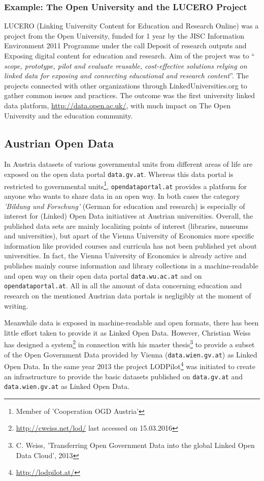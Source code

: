 \documentclass{article}
\begin{document}
\subsubsection{Example: The Open University and the LUCERO Project}
LUCERO (Linking University Content for Education and Research Online) was a project from the Open University, funded for 1 year by the JISC Information Environment 2011 Programme under the call Deposit of research outputs and Exposing digital content for education and research. Aim of the project was to "` \textit{ scope, prototype, pilot and evaluate reusable, cost-effective solutions relying on linked data for exposing and connecting educational and research content}"'.\cite{url:lucero} The projects connected with other organizations through LinkedUniversities.org to gather common issues and practices. The outcome was the first university linked data platform, \url{http://data.open.ac.uk/}, with much impact on The Open University and the education community.

\subsection{Austrian Open Data}
\label{related-work:austrian-open-data}
In Austria datasets of various governmental units from different areas of life are exposed on the open data portal \texttt{data.gv.at}. Whereas this data portal is restricted to governmental units\footnote{Member of 'Cooperation OGD Austria'}, \texttt{opendataportal.at} provides a platform for anyone who wants to share data in an open way. In both cases the category \textit{'Bildung und Forschung'} (German for education and research) is especially of interest for (Linked) Open Data initiatives at Austrian universities. Overall, the published data sets are mainly localizing points of interest (libraries, museums and universities), but apart of the Vienna University of Economics more specific information like provided courses and curricula has not been published yet about universities. In fact, the Vienna University of Economics is already active and publishes mainly course information and library collections in a machine-readable and open way on their open data portal \texttt{data.wu.ac.at} and on \texttt{opendataportal.at}. All in all the amount of data concerning education and research on the mentioned Austrian data portals is negligibly at the moment of writing.

Meanwhile data is exposed in machine-readable and open formats, there has been little effort taken to provide it as Linked Open Data. However, Christian Weiss has designed a system\footnote{\url{http://cweiss.net/lod/} last accessed on 15.03.2016} in connection with his master thesis\footnote{C. Weiss, 'Transferring Open Government Data into the global Linked Open Data Cloud', 2013} to provide a subset of the Open Government Data provided by Vienna (\texttt{data.wien.gv.at}) as Linked Open Data. In the same year 2013 the project LODPilot\footnote{\url{http://lodpilot.at/}} was initiated to create an infrastructure to provide the basic datasets published on \texttt{data.gv.at} and \texttt{data.wien.gv.at} as Linked Open Data.
\end{document}
